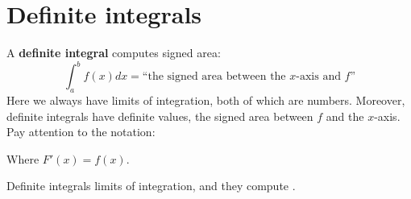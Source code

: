 \documentclass{ximera}
\begin{document}
\section{Definite integrals}

A \textbf{definite integral} computes signed area:
\[
\int_a^b f(x) dx = \text{``the signed area between the $x$-axis and $f$''}
\]
Here we always have limits of integration, both of which are
numbers. Moreover, definite integrals have definite values, the signed
area between $f$ and the $x$-axis. Pay attention to the notation:
\begin{image}
\end{image}
Where $F'(x) = f(x)$.
\begin{explanation}%
  Definite integrals  limits of integration, and they compute
  .
\end{explanation}
\end{document}
